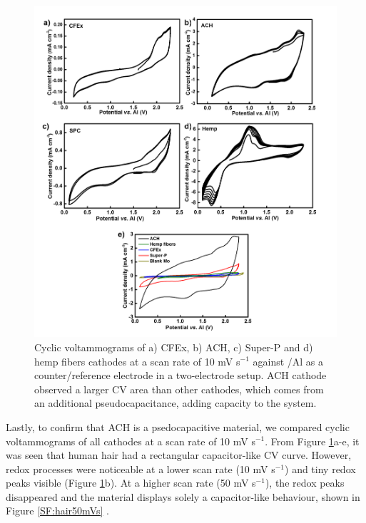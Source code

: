 \documentclass{article}
\begin{document}
 \begin{figure}[tbh!]
  \centering
  \includegraphics[width=\textwidth]{figures/CV}
    \caption{Cyclic voltammograms of a) CFEx, b) ACH, c) Super-P and d) hemp fibers cathodes at a scan rate of 10 mV s$^{-1}$ against /Al as a counter/reference electrode in a two-electrode setup. ACH cathode observed a larger CV area than other cathodes, which comes from an additional pseudocapacitance, adding capacity to the system.}
  \label{figures:CV}
\end{figure}

Lastly, to confirm that ACH is a psedocapacitive material, we compared cyclic voltammograms of all cathodes at a scan rate of 10 mV s$^{-1}$. From Figure \ref{figures:CV}a-e, it was seen that human hair had a rectangular capacitor-like CV curve. However, redox processes were noticeable at a lower scan rate (10 mV s$^{-1}$) and tiny redox peaks visible (Figure \ref{figures:CV}b). At a higher scan rate (50 mV s$^{-1}$), the redox peaks disappeared and the material displays solely a capacitor-like behaviour, shown in Figure \ref{SF:hair50mVs} \cite{guan_capacitive, dupont_separating}. 
\end{document}
